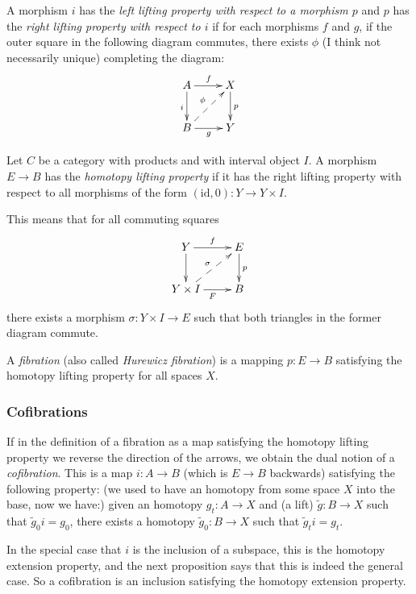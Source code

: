 \begin{definition}
\label{definition-https-ncatl-org-nlab}
	A morphism $i$ has the {\it left lifting
	property with respect to a morphism $p$} and
	$p$ has the {\it right lifting property with
	respect to $i$} if for each morphisms $f$
	and $g$, if the outer square in the
	following diagram commutes, there exists
	$\phi$ (I think not necessarily unique)
	completing the diagram:
	$$
	\xymatrix@R=2.5em{
		A\ar[r]^{f}\ar[d]_{i}&X\ar[d]^{p}\\
		B\ar[r]_{g}\ar@{-->}[ur]^{\phi}&Y
	}
	$$
\end{definition}

\begin{definition}
Let $C$ be a category with products and with
interval object $I$. A morphism $E\to B$ has
the {\it homotopy lifting property} if it has
the right lifting property with respect to
all morphisms of the form $(\text{id},0):Y\to
Y\times I$.
\label{definition-homot-lifti-prope-nlab}

	This means that for all commuting squares
	$$
	\xymatrix{
		Y\ar[r]^{f}\ar[d]&E\ar[d]^{p}\\
		Y\times I\ar[r]_{F}\ar@{-->}[ur]^{\sigma}&B
	}
	$$
	there exists a morphism $\sigma:Y\times I\to
	E$ such that both triangles in the former
	diagram commute.

	A {\it fibration} (also called {\it Hurewicz
	fibration}) is a mapping $p:E\to B$
	satisfying the homotopy lifting property for
	all spaces $X$.
\end{definition}

\subsubsection{Cofibrations}
\label{subsection-cofibrations}

\begin{definition}[Hatcher]
\label{definition-hatcher-2}
	If in the definition of a fibration as a map
	satisfying the homotopy lifting property we
	reverse the direction of the arrows, we
	obtain the dual notion of a {\it
	cofibration}. This is a map $i:A\to B$
	(which is $E\to B$ backwards) satisfying the
	following property: (we used to have an
	homotopy from some space $X$ into the base,
	now we have:) given an homotopy $g_{t}:A\to
	X$ and (a lift)  $\tilde{g}:B\to X$ such
	that $\tilde{g}_{0}i=g_{0}$, there exists a
	homotopy $\tilde{g}_{0}:B\to X$ such that
	$\tilde{g}_{t}i=g_{t}$.

	In the special case that $i$ is the
	inclusion of a subspace, this is the
	homotopy extension property, and the next
	proposition says that this is indeed the
	general case. So a cofibration is an
	inclusion satisfying the homotopy extension
	property.
\end{definition}

